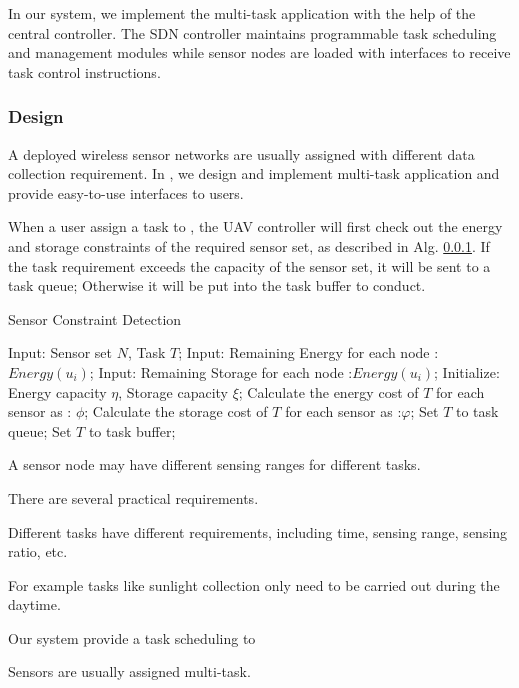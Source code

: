 In our {\sdn} system, we implement the multi-task application 
with the help of the central controller. The SDN controller
maintains programmable task scheduling and management
modules while sensor nodes are loaded with interfaces to
receive task control instructions.     

\subsubsection{Design}

A deployed wireless sensor networks are usually assigned  with
different data collection requirement. In {\sdn}, we design and 
implement multi-task application and provide easy-to-use
interfaces to users.

When a user assign a task to {\sdn}, the UAV controller will first check out 
the energy and storage constraints of the required sensor set, as described in Alg. \ref{}. 
If the task requirement exceeds the capacity of the sensor set, it will be sent to a     
task queue; Otherwise it will be put into the task buffer to conduct.


\begin{algorithm}
\caption{Sensor Constraint Detection}
\label{Constraint}
\begin{algorithmic}[1]
\STATE Input: Sensor set $N$, Task $T$;
\STATE Input: Remaining Energy for each node :$Energy(u_i)$;
\STATE Input: Remaining Storage for each node :$Energy(u_i)$;
\STATE Initialize: Energy capacity $\eta$, Storage capacity $\xi$;
\STATE Calculate the energy cost of $T$ for each sensor as : $\phi$;
\STATE Calculate the storage cost of $T$ for each sensor as :$\varphi$;
   	 \STATE Set $T$ to task queue;
   	 \ENDIF
\ENDFOR
\STATE Set $T$ to task buffer;
\end{algorithmic}
\end{algorithm}


A sensor node may have different sensing ranges for different tasks.


There are several practical requirements.

Different tasks have different requirements, including time, sensing range, sensing ratio, etc.

For example tasks like sunlight collection only need to be carried out during the daytime.

Our system provide a task scheduling to 

Sensors are usually assigned multi-task.

